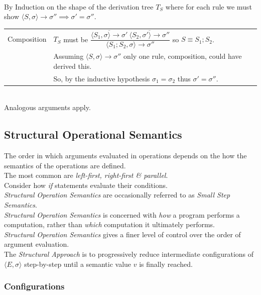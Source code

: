 \documentclass[11pt,a4paper]{article}
\begin{document}
\\
By Induction on the shape of the derivation tree $T_S$ where for each rule we must show $\langle S,\sigma\rangle\to\sigma''\implies \sigma'=\sigma''$.\\
\begin{tabular}{ll}
Composition&$T_S$ must be $\dfrac{\overline{\langle S_1,\sigma\rangle\to\sigma'}\ \overline{\langle S_2,\sigma'\rangle\to\sigma''}}{\langle S_1; S_2,\sigma\rangle\to\sigma''}$ so $S\equiv S_1;S_2$.\\
&Assuming $\langle S,\sigma\rangle\to\sigma''$ only one rule, composition, could have derived this.\\
&So, by the inductive hypothesis $\sigma_1=\sigma_2$ thus $\sigma'=\sigma''$.
\end{tabular}\\
Analogous arguments apply.

\subsection{Structural Operational Semantics}

The order in which arguments evaluated in operations depends on the how the semantics of the operations are defined.\\
The most common are \textit{left-first, right-first \& parallel}.\\
\nb Consider how \textit{if} statements evaluate their conditions.\\


\textit{Structural Operation Semantics} are occasionally referred to as \textit{Small Step Semantics}.\\

\textit{Structural Operation Semantics} is concerned with \textit{how} a program performs a computation, rather than \textit{which} computation it ultimately performs.\\
\textit{Structural Operation Semantics} gives a finer level of control over the order of argument evaluation.\\

The \textit{Structural Approach} is to progressively reduce intermediate configurations of $\langle E,\sigma\rangle$ step-by-step until a semantic value $v$ is finally reached.\\

\subsubsection{Configurations}
\end{document}
